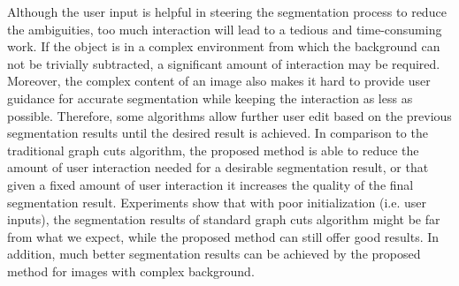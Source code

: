 Although the user input is helpful in steering the segmentation
process to reduce the ambiguities, too much interaction will lead to
a tedious and time-consuming work. If the object is in a complex
environment from which the background can not be trivially
subtracted, a significant amount of interaction may be required.
Moreover, the complex content of an image also makes it hard to
provide user guidance for accurate segmentation while keeping the
interaction as less as possible. Therefore, some algorithms allow
further user edit based on the previous segmentation results
\cite{grabcut,lazy,paint,Video} until the desired result is
achieved. In comparison to the traditional graph cuts algorithm, the
proposed method is able to reduce the amount of user interaction
needed for a desirable segmentation result, or that given a fixed
amount of user interaction it increases the quality of the final
segmentation result. Experiments show that with poor initialization
(i.e. user inputs), the segmentation results of standard graph cuts
algorithm might be far from what we expect, while the proposed
method can still offer good results. In addition, much better
segmentation results can be achieved by the proposed method for
images with complex background.

